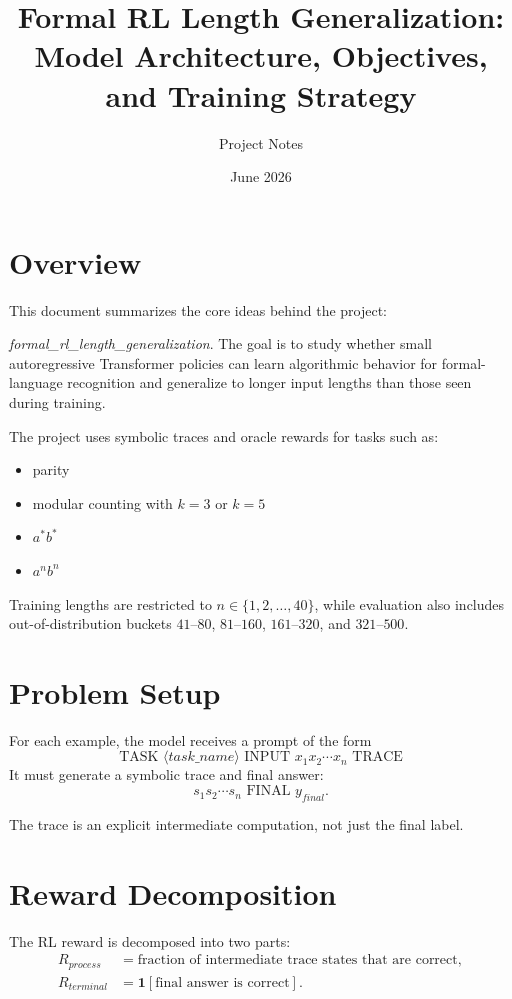 \documentclass[11pt]{article}
\title{Formal RL Length Generalization: Model Architecture, Objectives, and Training Strategy}
\author{Project Notes}
\date{June 2026}
\begin{document}
\maketitle

\section{Overview}
This document summarizes the core ideas behind the project:\par
\emph{formal\_rl\_length\_generalization}. The goal is to study whether small autoregressive Transformer policies can learn algorithmic behavior for formal-language recognition and generalize to longer input lengths than those seen during training.

The project uses symbolic traces and oracle rewards for tasks such as:
\begin{itemize}[leftmargin=*]
  \item parity
  \item modular counting with $k=3$ or $k=5$
  \item $a^*b^*$
  \item $a^n b^n$
\end{itemize}

Training lengths are restricted to $n \in \{1,2,\dots,40\}$, while evaluation also includes out-of-distribution buckets $41$--$80$, $81$--$160$, $161$--$320$, and $321$--$500$.

\section{Problem Setup}
For each example, the model receives a prompt of the form
\[
\text{TASK } \langle task\_name \rangle \text{ INPUT } x_1 x_2 \cdots x_n \text{ TRACE}
\]
It must generate a symbolic trace and final answer:
\[
s_1 s_2 \cdots s_n \text{ FINAL } y_{final}.
\]

The trace is an explicit intermediate computation, not just the final label.

\section{Reward Decomposition}
The RL reward is decomposed into two parts:
\begin{align*}
R_{process} &= \text{fraction of intermediate trace states that are correct},\\
R_{terminal} &= \mathbf{1}[\text{final answer is correct}].
\end{align*}
\end{document}
